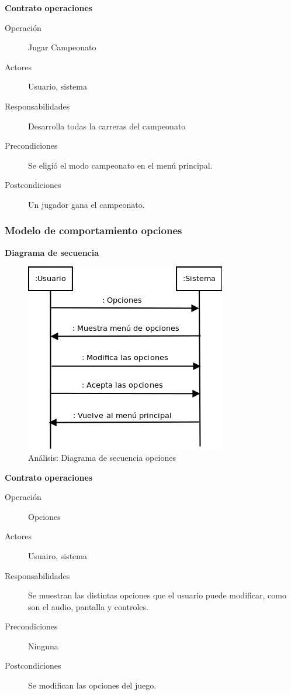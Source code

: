 \textbf{Contrato operaciones}

\begin{description}
    \item[Operación] Jugar Campeonato
    \item[Actores] Usuario, sistema
    \item[Responsabilidades] Desarrolla todas la carreras del campeonato
    \item[Precondiciones] Se eligió el modo campeonato en el menú principal.
    \item[Postcondiciones] Un jugador gana el campeonato.
\end{description}

\subsubsection{Modelo de comportamiento opciones}

\textbf{Diagrama de secuencia}
\begin{figure}[H]
  \label{dia_opciones}
  \begin{center}
    \includegraphics[scale=0.5]{imagenes/dia_opciones.png}
  \end{center}
  \caption{Análisis: Diagrama de secuencia opciones}
\end{figure}

\textbf{Contrato operaciones}

\begin{description}
    \item[Operación] Opciones
    \item[Actores] Usuairo, sistema
    \item[Responsabilidades] Se muestran las distintas opciones que el usuario puede modificar, como son el audio, pantalla y
    controles.
    \item[Precondiciones] Ninguna
    \item[Postcondiciones] Se modifican las opciones del juego.
\end{description}

